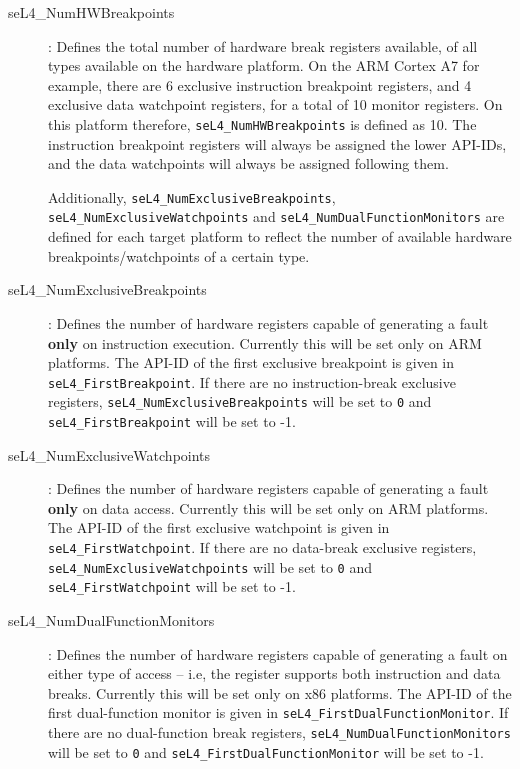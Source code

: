 \begin{description}
\item[seL4\_NumHWBreakpoints]: Defines the total number of hardware break
registers available, of all types available on the hardware platform. On the ARM
Cortex A7 for example, there are 6 exclusive instruction breakpoint registers,
and 4 exclusive data watchpoint registers, for a total of 10 monitor registers.
On this platform therefore, \texttt{seL4\_NumHWBreakpoints} is defined as 10.
The instruction breakpoint registers will always be assigned the lower API-IDs,
and the data watchpoints will always be assigned following them.

Additionally, \texttt{seL4\_NumExclusiveBreakpoints}, \texttt{seL4\_NumExclusiveWatchpoints}
and \texttt{seL4\_NumDualFunctionMonitors}
are defined for each target platform to reflect the number of available
hardware breakpoints/watchpoints of a certain type.

\item[seL4\_NumExclusiveBreakpoints]: Defines the number of hardware registers
capable of generating a fault \textbf{only} on instruction execution. Currently this will be
set only on ARM platforms. The API-ID of the first exclusive breakpoint is given
in \texttt{seL4\_FirstBreakpoint}. If there are no instruction-break exclusive
registers, \texttt{seL4\_NumExclusiveBreakpoints} will be set to \texttt{0} and
\texttt{seL4\_FirstBreakpoint} will be set to -1.

\item[seL4\_NumExclusiveWatchpoints]: Defines the number of hardware registers
capable of generating a fault \textbf{only} on data access. Currently this will be set only
on ARM platforms. The API-ID of the first exclusive watchpoint is given
in \texttt{seL4\_FirstWatchpoint}. If there are no data-break exclusive
registers, \texttt{seL4\_NumExclusiveWatchpoints} will be set to \texttt{0} and
\texttt{seL4\_FirstWatchpoint} will be set to -1.

\item[seL4\_NumDualFunctionMonitors]: Defines the number of hardware registers
capable of generating a fault on either type of access -- i.e, the register
supports both instruction and data breaks. Currently this will be set only on
x86 platforms. The API-ID of the first dual-function monitor is given
in \texttt{seL4\_FirstDualFunctionMonitor}. If there are no dual-function break
registers, \texttt{seL4\_NumDualFunctionMonitors} will be set to \texttt{0} and
\texttt{seL4\_FirstDualFunctionMonitor} will be set to -1.

\end{description}


